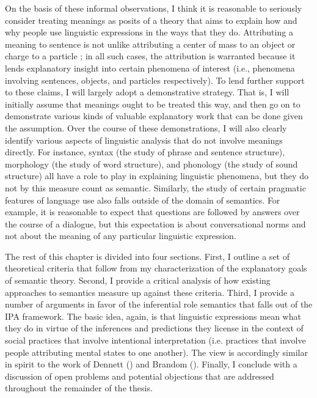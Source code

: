 On the basis of these informal observations, I think it is reasonable to seriously consider treating meanings as posits of a theory that aims to explain how and why people use linguistic expressions in the ways that they do. Attributing a meaning to sentence is not unlike attributing a center of mass to an object or charge to a particle \citep[see][]{Dennett:1987}; in all such cases, the attribution is warranted because it lends explanatory insight into certain phenomena of interest (i.e., phenomena involving sentences, objects, and particles respectively). To lend further support to these claims, I will largely adopt a demonstrative strategy. That is, I will initially assume that meanings ought to be treated this way, and then go on to demonstrate various kinds of valuable explanatory work that can be done given the assumption. Over the course of these demonstrations, I will also clearly identify various aspects of linguistic analysis that do not involve meanings directly. For instance, syntax (the study of phrase and sentence structure), morphology (the study of word structure), and phonology (the study of sound structure) all have a role to play in explaining linguistic phenomena, but they do not by this measure count as semantic. Similarly, the study of certain pragmatic features of language use also falls outside of the domain of semantics. For example, it is reasonable to expect that questions are followed by answers over the course of a dialogue, but this expectation is about conversational norms and not about the meaning of any particular linguistic expression.

The rest of this chapter is divided into four sections. First, I outline a set of theoretical criteria that follow from my characterization of the explanatory goals of semantic theory. Second, I provide a critical analysis of how existing approaches to semantics measure up against these criteria. Third, I provide a number of arguments in favor of the inferential role semantics that falls out of the IPA framework. The basic idea, again, is that linguistic expressions mean what they do in virtue of the inferences and predictions they license in the context of social practices that involve intentional interpretation (i.e. practices that involve people attributing mental states to one another). The view is accordingly similar in spirit to the work of Dennett (\citeyear{Dennett:1987,Dennett:1991}) and Brandom (\citeyear{Brandom:1994,Brandom:2009,Brandom:2000}). Finally, I conclude with a discussion of open problems and potential objections that are addressed throughout the remainder of the thesis. 

